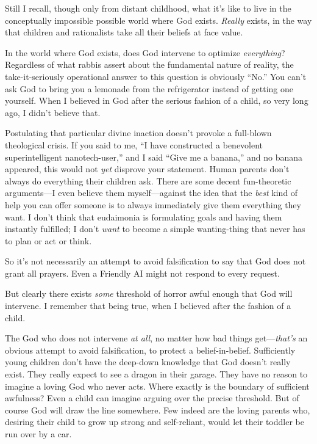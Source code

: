 {
 Still I recall, though only from distant childhood, what
it's like to live in the conceptually impossible
possible world where God exists. \textit{Really} exists, in the way
that children and rationalists take all their beliefs at face value.}

{
 In the world where God exists, does God intervene to optimize
\textit{everything}? Regardless of what rabbis assert about the
fundamental nature of reality, the take-it-seriously operational answer
to this question is obviously
``No.'' You can't
ask God to bring you a lemonade from the refrigerator instead of
getting one yourself. When I believed in God after the serious fashion
of a child, so very long ago, I didn't believe that.}

{
 Postulating that particular divine inaction
doesn't provoke a full-blown theological crisis. If you
said to me, ``I have constructed a benevolent
superintelligent nanotech-user,'' and I said
``Give me a banana,'' and no banana
appeared, this would not \textit{yet} disprove your statement. Human
parents don't always do everything their children ask.
There are some decent fun-theoretic arguments---I even believe them
myself---against the idea that the \textit{best} kind of help you can
offer someone is to always immediately give them everything they want.
I don't think that eudaimonia is formulating goals and
having them instantly fulfilled; I don't \textit{want}
to become a simple wanting-thing that never has to plan or act or
think.}

{
 So it's not necessarily an attempt to avoid
falsification to say that God does not grant all prayers. Even a
Friendly AI might not respond to every request.}

{
 But clearly there exists \textit{some} threshold of horror awful
enough that God will intervene. I remember that being true, when I
believed after the fashion of a child.}

{
 The God who does not intervene \textit{at all}, no matter how bad
things get---\textit{that's} an obvious attempt to
avoid falsification, to protect a belief-in-belief. Sufficiently young
children don't have the deep-down knowledge that God
doesn't really exist. They really expect to see a
dragon in their garage. They have no reason to imagine a loving God who
never acts. Where exactly is the boundary of sufficient awfulness? Even
a child can imagine arguing over the precise threshold. But of course
God will draw the line somewhere. Few indeed are the loving parents
who, desiring their child to grow up strong and self-reliant, would let
their toddler be run over by a car.}

